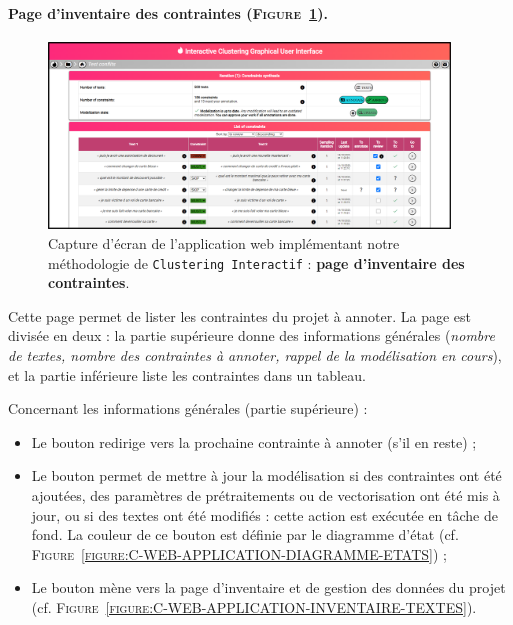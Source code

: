 		
		\paragraph{Page d'inventaire des contraintes (\textsc{Figure~\ref{figure:C-WEB-APPLICATION-INVENTAIRE-CONTRAINTES}}).}
		
			\begin{figure}[H]
				\centering
				\includegraphics[width=0.95\textwidth]{figures/interactive-clustering-application-contraintes}
				\caption{
					Capture d'écran de l'application web implémentant notre méthodologie de \texttt{Clustering Interactif} : \textbf{page d'inventaire des contraintes}.
				}
				\label{figure:C-WEB-APPLICATION-INVENTAIRE-CONTRAINTES}
			\end{figure}
			
			Cette page permet de lister les contraintes du projet à annoter.
			La page est divisée en deux : la partie supérieure donne des informations générales (\textit{nombre de textes, nombre des contraintes à annoter, rappel de la modélisation en cours}), et la partie inférieure liste les contraintes dans un tableau.
			
			Concernant les informations générales (partie supérieure) :
			\begin{itemize}
				\item Le bouton  redirige vers la prochaine contrainte à annoter (s'il en reste) ;
				\item Le bouton  permet de mettre à jour la modélisation si des contraintes ont été ajoutées, des paramètres de prétraitements ou de vectorisation ont été mis à jour, ou si des textes ont été modifiés : cette action est exécutée en tâche de fond.
				La couleur de ce bouton est définie par le diagramme d'état (cf. \textsc{Figure~\ref{figure:C-WEB-APPLICATION-DIAGRAMME-ETATS}}) ;
				\item Le bouton  mène vers la page d'inventaire et de gestion des données du projet (cf. \textsc{Figure~\ref{figure:C-WEB-APPLICATION-INVENTAIRE-TEXTES}}).
			\end{itemize}
			
